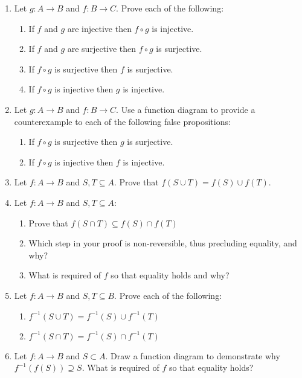 \documentclass[letterpaper,12pt,fleqn]{article}
\begin{document}
\begin{enumerate}[left=0in,itemsep=0.5in]
\item Let \(g:A\to B\) and \(f:B\to C\).  Prove each of the following:
  \begin{enumerate}
  \item If \(f\) and \(g\) are injective then \(f\circ g\) is injective.
  \item If \(f\) and \(g\) are surjective then \(f\circ g\) is surjective.
  \item If \(f\circ g\) is surjective then \(f\) is surjective.
  \item If \(f\circ g\) is injective then \(g\) is injective.
  \end{enumerate}

\item Let \(g:A\to B\) and \(f:B\to C\).  Use a function diagram to provide a counterexample to each of the
  following false propositions:
  \begin{enumerate}
  \item If \(f\circ g\) is surjective then \(g\) is surjective.
  \item If \(f\circ g\) is injective then \(f\) is injective.
  \end{enumerate}

\item Let \(f:A\to B\) and \(S,T\subseteq A\).  Prove that \(f(S\cup T)=f(S)\cup f(T)\).

\item Let \(f:A\to B\) and \(S,T\subseteq A\):
  \begin{enumerate}
  \item Prove that \(f(S\cap T)\subseteq f(S)\cap f(T)\)
  \item Which step in your proof is non-reversible, thus precluding equality, and why?
  \item What is required of \(f\) so that equality holds and why?
  \end{enumerate}

\item Let \(f:A\to B\) and \(S,T\subseteq B\).  Prove each of the following:
  \begin{enumerate}
  \item \(f^{-1}(S\cup T)=f^{-1}(S)\cup f^{-1}(T)\)
  \item \(f^{-1}(S\cap T)=f^{-1}(S)\cap f^{-1}(T)\)
  \end{enumerate}

\item Let \(f:A\to B\) and \(S\subset A\).  Draw a function diagram to demonstrate why \(f^{-1}(f(S))\supseteq S\).
  What is required of \(f\) so that equality holds?


\end{enumerate}
\end{document}
